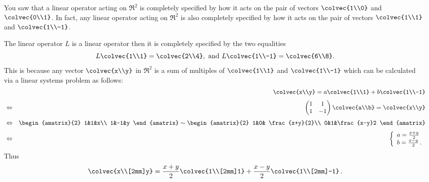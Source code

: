 You saw that a linear operator acting on $\Re^2$ is completely specified by how it acts on the pair of vectors $\colvec{1\\0}$ and $\colvec{0\\1}$. 
In fact, any linear operator acting on $\Re^2$ is also completely specified by how it acts on the pair of vectors $\colvec{1\\1}$ and $\colvec{1\\-1}$.

\begin{example} The linear operator $L$ is a linear operator then it is completely specified \hypertarget{nonstandard r2 basis}{by the two equalities} 
\[
L\colvec{1\\1}= \colvec{2\\4}, {\rm ~and~} L\colvec{1\\-1}=\colvec{6\\8}.
\] 
This is because any vector $\colvec{x\\y}$ in $\Re^2$ is a sum of multiples of
$\colvec{1\\1}$ and $\colvec{1\\-1}$ which can be calculated via a linear systems problem as follows:
\begin{eqnarray*}&&
\colvec{x\\y}=a\colvec{1\\1}+b\colvec{1\\-1}\\[1mm]
&\Leftrightarrow& 
\begin{pmatrix}
1&1\\
1&-1
\end{pmatrix}
\colvec{a\\b}
=\colvec{x\\y}\\[1mm]
&\Leftrightarrow& 
\begin{amatrix}{2}
1&1&x\\
1&-1&y
\end{amatrix}
\sim \begin{amatrix}{2}
1&0& \frac{x+y}{2}\\
0&1&\frac{x-y}2
\end{amatrix}\\[1mm]
&\Leftrightarrow&
\left\{ 
\begin{array}{l}
a=\frac{x+y}{2}\\
b=\frac{x-y}{2}\, .
\end{array}
\right.
\end{eqnarray*}
Thus
\[
\colvec{x\\[2mm]y}=\frac{x+y}{2}\colvec{1\\[2mm]1}+\frac{x-y}{2}\colvec{1\\[2mm]-1}\, .
\]
\end{example}
